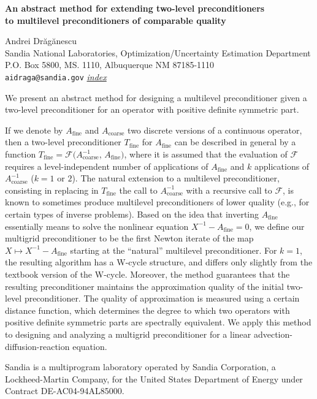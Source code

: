 \documentclass{report}
\begin{document}

\begin{center}
{\large
{\bf An abstract method for extending two-level preconditioners \\
to multilevel preconditioners of comparable quality}}

        Andrei Dr{\u a}g{\u a}nescu \\
        Sandia National Laboratories,
        Optimization/Uncertainty Estimation Department \\
        P.O. Box 5800, MS. 1110, Albuquerque NM 87185-1110 \\
                        \hspace*{9mm}\hfill
        {\tt aidraga@sandia.gov}
                        \hfill  \hyperlink{index}{\small {\em
index}} \\
\end{center}

We present an abstract method for designing a
multilevel
preconditioner given a two-level preconditioner for
an
operator with positive definite symmetric part.

If we denote by $A_{\mathrm{fine}}$ and
$A_{\mathrm{coarse}}$ two discrete versions of a continuous
operator, then a two-level preconditioner
$T_{\mathrm{fine}}$ for $A_{\mathrm{fine}}$ can be
described in general by a function
$T_{\mathrm{fine}} = {\mathcal F}(A_{\mathrm{coarse}}^{-1}$,
$A_{\mathrm{fine}})$,
where it is assumed that the evaluation of ${\mathcal F}$
requires a level-independent  number of applications of
$A_{\mathrm{fine}}$ and $k$  applications of
$A_{\mathrm{coarse}}^{-1}$  ($k=1$ or $2$).  The natural
extension to a multilevel preconditioner, consisting in
replacing in $T_{\mathrm{fine}}$ the call to
$A_{\mathrm{coarse}}^{-1}$ with a recursive call to
${\mathcal F}$, is known to sometimes produce multilevel
preconditioners of lower quality (e.g., for certain types
of inverse problems).  Based on the idea that inverting
$A_{\mathrm{fine}}$ essentially means to solve the
nonlinear  equation \mbox{$X^{-1} - A_{\mathrm{fine}}= 0$},
we define our multigrid preconditioner to be the first
Newton iterate of the map $X\mapsto X^{-1} -
A_{\mathrm{fine}}$ starting at the ``natural'' multilevel
preconditioner.  For $k=1$, the resulting algorithm has a
W-cycle structure, and differs only slightly from the
textbook version of the W-cycle.  Moreover, the method
guarantees that the resulting preconditioner maintains the
approximation quality of the initial two-level
preconditioner.  The quality of approximation is measured
using a certain distance function, which determines the
degree to which two operators with positive definite 
symmetric parts are spectrally equivalent.  We apply this
method to designing and analyzing a multigrid
preconditioner for a linear advection-diffusion-reaction
equation. 

{\small Sandia is a multiprogram laboratory operated by
Sandia Corporation, a Lockheed-Martin Company, for the
United States Department of Energy under 
Contract DE-AC04-94AL85000.}




\end{document}
